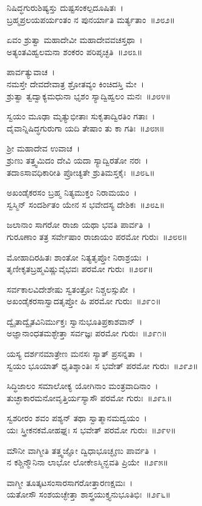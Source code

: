 ನಿಷಿದ್ಧಗುರುಶಿಷ್ಯಸ್ತು ದುಷ್ಟಸಂಕಲ್ಪದೂಷಿತಃ~।\\
ಬ್ರಹ್ಮಪ್ರಲಯಪರ್ಯಂತಂ ನ ಪುನರ್ಯಾತಿ ಮರ್ತ್ಯತಾಂ~॥೨೮೨॥

ಏವಂ ಶ್ರುತ್ವಾ ಮಹಾದೇವೀ ಮಹಾದೇವವಚಸ್ತಥಾ~।\\
ಅತ್ಯಂತವಿಹ್ವಲಮನಾ ಶಂಕರಂ ಪರಿಪೃಚ್ಛತಿ~॥೨೮೩॥

ಪಾರ್ವತ್ಯುವಾಚ~।\\
ನಮಸ್ತೇ ದೇವದೇವಾತ್ರ ಶ್ರೋತವ್ಯಂ ಕಿಂಚಿದಸ್ತಿ ಮೇ~।\\
ಶ್ರುತ್ವಾ ತ್ವದ್ವಾಕ್ಯಮಧುನಾ ಭೃಶಂ ಸ್ಯಾದ್ವಿಹ್ವಲಂ ಮನಃ~॥೨೮೪॥

ಸ್ವಯಂ ಮೂಢಾ ಮೃತ್ಯುಭೀತಾಃ ಸುಕೃತಾದ್ವಿರತಿಂ ಗತಾಃ~।\\
ದೈವಾನ್ನಿಷಿದ್ಧಗುರುಗಾ ಯದಿ ತೇಷಾಂ ತು ಕಾ ಗತಿಃ~॥೨೮೫॥

ಶ್ರೀ ಮಹಾದೇವ ಉವಾಚ~।\\
ಶ್ರುಣು ತತ್ತ್ವಮಿದಂ ದೇವಿ ಯದಾ ಸ್ಯಾದ್ವಿರತೋ ನರಃ~।\\
ತದಾಽಸಾವಧಿಕಾರೀತಿ ಪ್ರೋಚ್ಯತೇ ಶ್ರುತಿಮಸ್ತಕೈಃ~॥೨೮೬॥

ಅಖಂಡೈಕರಸಂ ಬ್ರಹ್ಮ ನಿತ್ಯಮುಕ್ತಂ ನಿರಾಮಯಂ~।\\
ಸ್ವಸ್ಮಿನ್ ಸಂದರ್ಶಿತಂ ಯೇನ ಸ ಭವೇದಸ್ಯ ದೇಶಿಕಃ~॥೨೮೭॥

ಜಲಾನಾಂ ಸಾಗರೋ ರಾಜಾ ಯಥಾ ಭವತಿ ಪಾರ್ವತಿ~।\\
ಗುರೂಣಾಂ ತತ್ರ ಸರ್ವೇಷಾಂ ರಾಜಾಯಂ ಪರಮೋ ಗುರುಃ~॥೨೮೮॥

ಮೋಹಾದಿರಹಿತಃ ಶಾಂತೋ ನಿತ್ಯತೃಪ್ತೋ ನಿರಾಶ್ರಯಃ~।\\
ತೃಣೀಕೃತಬ್ರಹ್ಮವಿಷ್ಣುವೈಭವಃ ಪರಮೋ ಗುರುಃ~॥೨೮೯॥

ಸರ್ವಕಾಲವಿದೇಶೇಷು ಸ್ವತಂತ್ರೋ ನಿಶ್ಚಲಸ್ಸುಖೀ~।\\
ಅಖಂಡೈಕರಸಾಸ್ವಾದತೃಪ್ತೋ ಹಿ ಪರಮೋ ಗುರುಃ~॥೨೯೦॥

ದ್ವೈತಾದ್ವೈತವಿನಿರ್ಮುಕ್ತಃ ಸ್ವಾನುಭೂತಿಪ್ರಕಾಶವಾನ್~।\\
ಅಜ್ಞಾನಾಂಧತಮಶ್ಛೇತ್ತಾ ಸರ್ವಜ್ಞಃ ಪರಮೋ ಗುರುಃ~॥೨೯೧॥

ಯಸ್ಯ ದರ್ಶನಮಾತ್ರೇಣ ಮನಸಃ ಸ್ಯಾತ್ ಪ್ರಸನ್ನತಾ~।\\
ಸ್ವಯಂ ಭೂಯಾತ್ ಧೃತಿಶ್ಶಾಂತಿಃ ಸ ಭವೇತ್ ಪರಮೋ ಗುರುಃ~॥೨೯೨॥

ಸಿದ್ಧಿಜಾಲಂ ಸಮಾಲೋಕ್ಯ ಯೋಗಿನಾಂ ಮಂತ್ರವಾದಿನಾಂ~।\\
ತುಚ್ಛಾಕಾರಮನೋವೃತ್ತಿರ್ಯಸ್ಯಾಸೌ ಪರಮೋ ಗುರುಃ~॥೨೯೩॥

ಸ್ವಶರೀರಂ ಶವಂ ಪಶ್ಯನ್ ತಥಾ ಸ್ವಾತ್ಮಾನಮದ್ವಯಂ~।\\
ಯಃ ಸ್ತ್ರೀಕನಕಮೋಹಘ್ನಃ ಸ ಭವೇತ್ ಪರಮೋ ಗುರುಃ~॥೨೯೪॥

ಮೌನೀ ವಾಗ್ಮೀತಿ ತತ್ತ್ವಜ್ಞೋ ದ್ವಿಧಾಭೂಚ್ಛೃಣು ಪಾರ್ವತಿ~।\\
ನ ಕಶ್ಚಿನ್ಮೌನಿನಾ ಲಾಭೋ ಲೋಕೇಽಸ್ಮಿನ್ಭವತಿ ಪ್ರಿಯೇ~॥೨೯೫॥

ವಾಗ್ಮೀ ತೂತ್ಕಟಸಂಸಾರಸಾಗರೋತ್ತಾರಣಕ್ಷಮಃ~।\\
ಯತೋಸೌ ಸಂಶಯಚ್ಛೇತ್ತಾ ಶಾಸ್ತ್ರಯುಕ್ತ್ಯನುಭೂತಿಭಿಃ~॥೨೯೬॥

